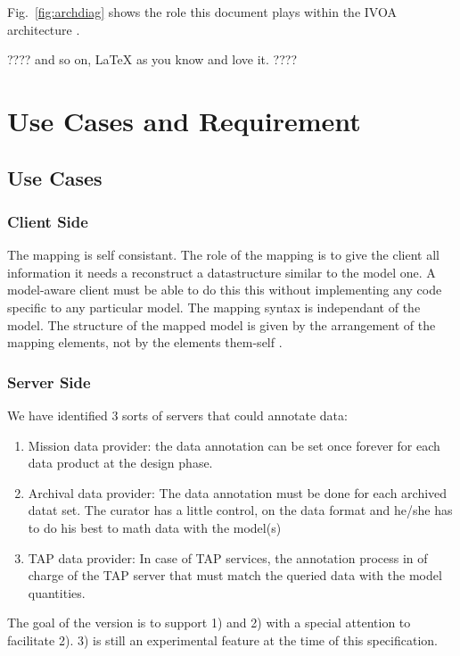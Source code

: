 \documentclass[11pt,a4paper]{ivoa}
\begin{document}
Fig.~\ref{fig:archdiag} shows the role this document plays within the
IVOA architecture \citep{note:VOARCH}.

???? and so on, LaTeX as you know and love it. ????

\section{Use Cases and Requirement}

\subsection{Use Cases}

\subsubsection{Client Side}
The mapping is self consistant. The role of the mapping is to give the client all information it needs a reconstruct a datastructure similar to the model one. 
A model-aware client must be able to do this  this without implementing any code specific to any particular model.  The mapping syntax is independant of the model. The structure of the mapped model is given by the arrangement of the mapping elements, not by the elements them-self
.

\subsubsection{Server Side}
We have identified 3 sorts of servers that could annotate data:
\begin{enumerate}
   \item Mission data provider: the data annotation can be set once forever for each data product at the design phase.
   \item Archival data provider: The data annotation must be done for each archived datat set. The curator has a little control, on the data format and he/she has to do his best to math data with the model(s) 
   \item  TAP data provider: In case of TAP services, the annotation process in of charge of the TAP server that must match the queried data with the model quantities.
\end{enumerate}

The goal of the version is to support 1) and 2) with a special attention to facilitate 2). 3) is still an experimental feature at the time of this specification.
\end{document}
